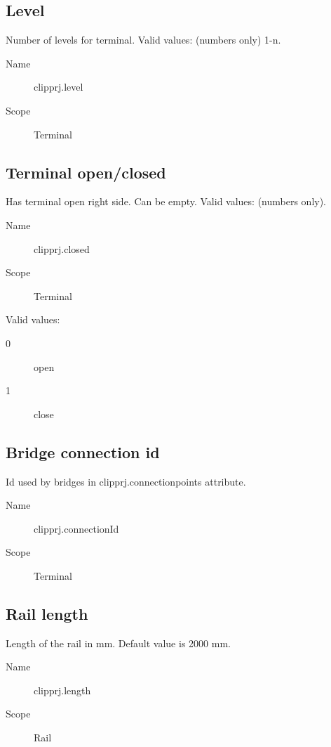 \documentclass[%
	a4paper,
	oneside,
	listof=numbered,
	parskip=half,
	headsepline=true,
	footsepline=false,
	0.7headlines,
	]{scrbook}
\begin{document}
\subsection{Level}

Number of levels for terminal.
Valid values: (numbers only) 1-n.

\begin{description}
	\item[Name] clipprj.level
	\item[Scope] Terminal
\end{description}

\subsection{Terminal open/closed}

Has terminal open right side.
Can be empty.
Valid values: (numbers only).

\begin{description}
	\item[Name] clipprj.closed
	\item[Scope] Terminal
\end{description}

Valid values:

\begin{description}
	\item[0] open
	\item[1] close
\end{description}

\subsection{Bridge connection id}

Id used by bridges in clipprj.connectionpoints attribute.

\begin{description}
	\item[Name] clipprj.connectionId
	\item[Scope] Terminal
\end{description}

\subsection{Rail length}

Length of the rail in mm.
Default value is 2000 mm.

\begin{description}
	\item[Name] clipprj.length
	\item[Scope] Rail
\end{description}
\end{document}
